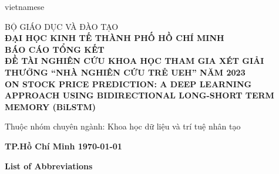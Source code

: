 \documentclass[a4paper]{article}
\begin{document}
\fontsize{13pt}{15pt}\selectfont
\setlength{\parindent}{0cm}
\setlength{\parskip}{1.5ex}
\setlength{\baselineskip}{1.5\baselineskip}
\begin{otherlanguage*}{vietnamese}
\begin{titlepage}

 
\begin{center}

\Large BỘ GIÁO DỤC VÀ ĐÀO TẠO\\[7pt]
\textbf{\Large ĐẠI HỌC KINH TẾ THÀNH PHỐ HỒ CHÍ MINH}\\[3.5cm]
\LARGE\textbf{BÁO CÁO TỔNG KẾT}\\[0.5cm]
\Large\textbf{ĐỀ TÀI NGHIÊN CỨU KHOA HỌC THAM GIA XÉT GIẢI THƯỞNG ``NHÀ NGHIÊN CỨU TRẺ UEH'' NĂM 2023}\\[3cm]

\LARGE\textbf{ON STOCK PRICE PREDICTION: A DEEP LEARNING APPROACH USING BIDIRECTIONAL LONG-SHORT TERM MEMORY (BiLSTM)}
\end{center}
\vspace{1.5cm}
Thuộc nhóm chuyên ngành: Khoa học dữ liệu và trí tuệ nhân tạo

\vfill
\begin{center}
\large \textbf{TP.Hồ Chí Minh {\today}}
\end{center}

\end{titlepage}
\end{otherlanguage*}

\tableofcontents
\pagebreak
\listoffigures
\pagebreak
\listoftables
\pagebreak
\textbf{List of Abbreviations}
\vspace{1cm}
\end{document}
